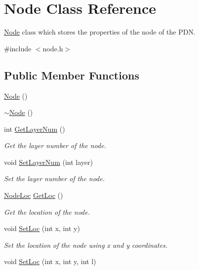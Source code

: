 \hypertarget{classNode}{}\section{Node Class Reference}
\label{classNode}


\hyperlink{classNode}{Node} class which stores the properties of the node of the P\+DN.  




{\ttfamily \#include $<$node.\+h$>$}

\subsection*{Public Member Functions}
\begin{DoxyCompactItemize}
\item 
\hyperlink{classNode_ad7a34779cad45d997bfd6d3d8043c75f}{Node} ()
\item 
\hyperlink{classNode_aa0840c3cb5c7159be6d992adecd2097c}{$\sim$\+Node} ()
\item 
int \hyperlink{classNode_a5937a2591132f22361ce12edfe6af39f}{Get\+Layer\+Num} ()
\begin{DoxyCompactList}\small\item\em Get the layer number of the node. \end{DoxyCompactList}\item 
void \hyperlink{classNode_a9ae3dca8ba172157836ca70eede370c5}{Set\+Layer\+Num} (int layer)
\begin{DoxyCompactList}\small\item\em Set the layer number of the node. \end{DoxyCompactList}\item 
\hyperlink{node_8h_a8457e7507941d06122aaf5c4ac260995}{Node\+Loc} \hyperlink{classNode_a02cc6f413616e5a1314ef708505ccdce}{Get\+Loc} ()
\begin{DoxyCompactList}\small\item\em Get the location of the node. \end{DoxyCompactList}\item 
void \hyperlink{classNode_ab228394a1e206cf5d1bc995307f70f56}{Set\+Loc} (int x, int y)
\begin{DoxyCompactList}\small\item\em Set the location of the node using x and y coordinates. \end{DoxyCompactList}\item 
void \hyperlink{classNode_aeaa0eb1b9fed6f5c92594282de4d4d7d}{Set\+Loc} (int x, int y, int l)

\end{DoxyCompactItemize}
